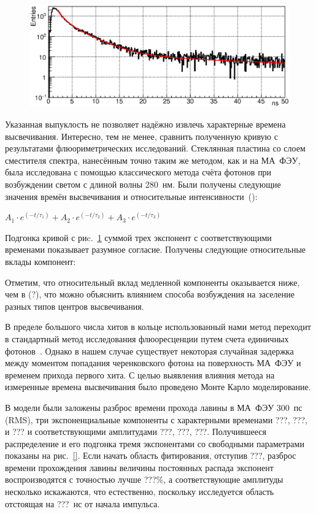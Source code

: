 \begin{figure}
\includegraphics[width=1.0\textwidth]{pictures/WLSdiff_1Nov.eps}
\caption{}
\label{fig:WLSdiff}
\end{figure}

Указанная выпуклость не позволяет надёжно извлечь характерные времена высвечивания. Интересно, тем не менее, сравнить полученную кривую с результатами флюориметрических исследований. Стеклянная пластина со слоем сместителя спектра, нанесённым точно таким же методом, как и на МА~ФЭУ, была исследована с помощью классического метода счёта фотонов при возбуждении светом с длиной волны 280~нм. Были получены следующие значения времён высвечивания и относительные интенсивности~(\cite{DUERR}):

$ A_{1} \cdot e^{(-t / \tau_{1})} + A_{2} \cdot e^{(-t / \tau_{2})} + A_{3} \cdot e^{(-t / \tau_{3})}$

Подгонка кривой с риc.~\ref{fig:WLSdiff} суммой трех экспонент с соответствующими временами показывает разумное согласие. Получены следующие относительные вклады компонент: 


Отметим, что относительный вклад медленной компоненты оказывается ниже, чем в (?), что можно объяснить влиянием способа возбуждения на заселение разных типов центров высвечивания.

В пределе большого числа хитов в кольце использованный нами метод переходит в стандартный метод исследования флюоресценции путем счета единичных фотонов~\cite{}. Однако в нашем случае существует некоторая случайная задержка между моментом попадания черенковского фотона на поверхность МА~ФЭУ и временем прихода первого хита. С целью выявления влияния метода на измеренные времена высвечивания было проведено Монте Карло моделирование.

В модели были заложены разброс времени прохода лавины в МА~ФЭУ 300~пс (RMS), три экспоненциальные компоненты с характерными временами ???, ???, и ??? и соответствующими амплитудами ???, ???, ???. Получившееся распределение и его подгонка тремя экспонентами со свободными параметрами показаны на рис.~\ref{}. Если начать область фитирования, отступив ???, разброс времени прохождения лавины величины постоянных распада экспонент воспроизводятся с точностью лучше ???\%, а соответствующие амплитуды несколько искажаются, что естественно, поскольку исследуется область отстоящая на ???~нс от начала импульса.

